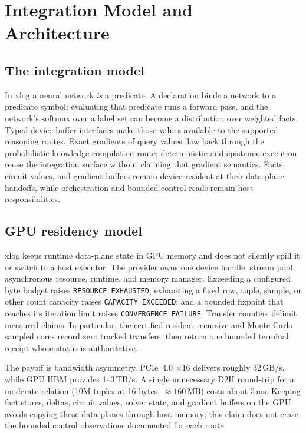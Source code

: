 \section{Integration Model and Architecture}\label{sec:arch}

\subsection{The integration model}

In xlog a neural network \emph{is} a predicate. A declaration binds a network to a predicate symbol; evaluating that predicate runs a forward pass, and the network's softmax over a label set can become a distribution over weighted facts. Typed device-buffer interfaces make those values available to the supported reasoning routes. Exact gradients of query values flow back through the probabilistic knowledge-compilation route; deterministic and epistemic execution reuse the integration surface without claiming that gradient semantics. Facts, circuit values, and gradient buffers remain device-resident at their data-plane handoffs, while orchestration and bounded control reads remain host responsibilities.
\subsection{GPU residency model}

xlog keeps runtime data-plane state in GPU memory and does not silently spill it or switch to a host executor. The provider owns one device handle, stream pool, asynchronous resource, runtime, and memory manager. Exceeding a configured byte budget raises \texttt{RESOURCE\_EXHAUSTED}; exhausting a fixed row, tuple, sample, or other count capacity raises \texttt{CAPACITY\_EXCEEDED}; and a bounded fixpoint that reaches its iteration limit raises \texttt{CONVERGENCE\_FAILURE}. Transfer counters delimit measured claims. In particular, the certified resident recursive and Monte Carlo sampled cores record zero tracked transfers, then return one bounded terminal receipt whose status is authoritative.

The payoff is bandwidth asymmetry. PCIe~4.0 $\times16$ delivers roughly 32\,GB/s, while GPU HBM provides 1--3\,TB/s. A single unnecessary D2H round-trip for a moderate relation (10M tuples at 16 bytes, ${\approx}160$\,MB) costs about 5\,ms. Keeping fact stores, deltas, circuit values, solver state, and gradient buffers on the GPU avoids copying those data planes through host memory; this claim does not erase the bounded control observations documented for each route.

